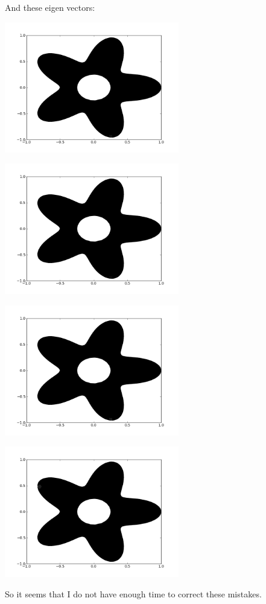\documentclass{article}
\begin{document}
And these eigen vectors:
\begin{center}
\includegraphics[width=3in]{prob4_eig0.png}

\includegraphics[width=3in]{prob4_eig1.png}

\includegraphics[width=3in]{prob4_eig2.png}

\includegraphics[width=3in]{prob4_eig3.png}
\end{center}

So it seems that I do not have enough time to correct these mistakes.
\end{document}
